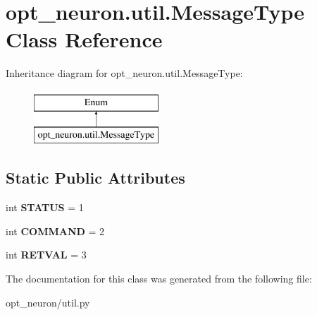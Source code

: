 \hypertarget{classopt__neuron_1_1util_1_1MessageType}{}\section{opt\+\_\+neuron.\+util.\+Message\+Type Class Reference}
\label{classopt__neuron_1_1util_1_1MessageType}
Inheritance diagram for opt\+\_\+neuron.\+util.\+Message\+Type\+:\begin{figure}[H]
\begin{center}
\leavevmode
\includegraphics[height=2.000000cm]{classopt__neuron_1_1util_1_1MessageType}
\end{center}
\end{figure}
\subsection*{Static Public Attributes}
\begin{DoxyCompactItemize}
\item 
\hypertarget{classopt__neuron_1_1util_1_1MessageType_a3fc09d8b0442815791b847fe240e0665}{}int {\bfseries S\+T\+A\+T\+U\+S} = 1\label{classopt__neuron_1_1util_1_1MessageType_a3fc09d8b0442815791b847fe240e0665}

\item 
\hypertarget{classopt__neuron_1_1util_1_1MessageType_a8400073e1604c2b134cb71d4803eba24}{}int {\bfseries C\+O\+M\+M\+A\+N\+D} = 2\label{classopt__neuron_1_1util_1_1MessageType_a8400073e1604c2b134cb71d4803eba24}

\item 
\hypertarget{classopt__neuron_1_1util_1_1MessageType_a59133ead95d5110d60c483c5151e728f}{}int {\bfseries R\+E\+T\+V\+A\+L} = 3\label{classopt__neuron_1_1util_1_1MessageType_a59133ead95d5110d60c483c5151e728f}

\end{DoxyCompactItemize}


The documentation for this class was generated from the following file\+:\begin{DoxyCompactItemize}
\item 
opt\+\_\+neuron/util.\+py\end{DoxyCompactItemize}
